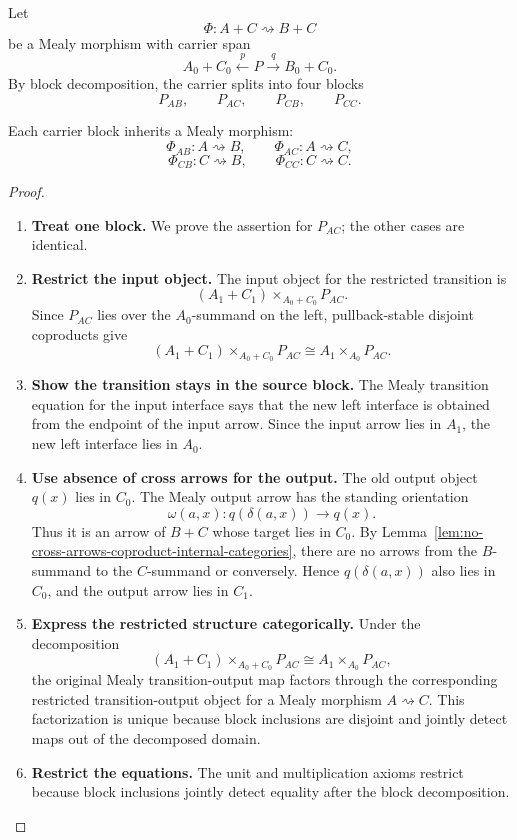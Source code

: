 Let
\[
  \Phi:A+C\rightsquigarrow B+C
\]
be a Mealy morphism with carrier span
\[
  A_0+C_0
  \xleftarrow{p}
  P
  \xrightarrow{q}
  B_0+C_0.
\]
By block decomposition, the carrier splits into four blocks
\[
  P_{AB},
  \qquad
  P_{AC},
  \qquad
  P_{CB},
  \qquad
  P_{CC}.
\]

\begin{lemma}
\label{lem:mealy-block-restriction-feedback}
Each carrier block inherits a Mealy morphism:
\[
  \Phi_{AB}:A\rightsquigarrow B,
  \qquad
  \Phi_{AC}:A\rightsquigarrow C,
\]
\[
  \Phi_{CB}:C\rightsquigarrow B,
  \qquad
  \Phi_{CC}:C\rightsquigarrow C.
\]
\end{lemma}

\begin{proof}
\begin{enumerate}
  \item \textbf{Treat one block.}
  We prove the assertion for \(P_{AC}\); the other cases are identical.

  \item \textbf{Restrict the input object.}
  The input object for the restricted transition is
  \[
    (A_1+C_1)\times_{A_0+C_0}P_{AC}.
  \]
  Since \(P_{AC}\) lies over the \(A_0\)-summand on the left,
  pullback-stable disjoint coproducts give
  \[
    (A_1+C_1)\times_{A_0+C_0}P_{AC}
    \cong
    A_1\times_{A_0}P_{AC}.
  \]

  \item \textbf{Show the transition stays in the source block.}
  The Mealy transition equation for the input interface says that the new left
  interface is obtained from the endpoint of the input arrow. Since the input
  arrow lies in \(A_1\), the new left interface lies in \(A_0\).

  \item \textbf{Use absence of cross arrows for the output.}
  The old output object \(q(x)\) lies in \(C_0\). The Mealy output arrow has
  the standing orientation
  \[
    \omega(a,x):q(\delta(a,x))\longrightarrow q(x).
  \]
  Thus it is an arrow of \(B+C\) whose target lies in \(C_0\). By
  Lemma~\ref{lem:no-cross-arrows-coproduct-internal-categories}, there are no
  arrows from the \(B\)-summand to the \(C\)-summand or conversely. Hence
  \(q(\delta(a,x))\) also lies in \(C_0\), and the output arrow lies in
  \(C_1\).

  \item \textbf{Express the restricted structure categorically.}
  Under the decomposition
  \[
    (A_1+C_1)\times_{A_0+C_0}P_{AC}
    \cong
    A_1\times_{A_0}P_{AC},
  \]
  the original Mealy transition-output map factors through the corresponding
  restricted transition-output object for a Mealy morphism
  \(A\rightsquigarrow C\). This factorization is unique because block
  inclusions are disjoint and jointly detect maps out of the decomposed
  domain.

  \item \textbf{Restrict the equations.}
  The unit and multiplication axioms restrict because block inclusions jointly
  detect equality after the block decomposition.
\end{enumerate}
\end{proof}

